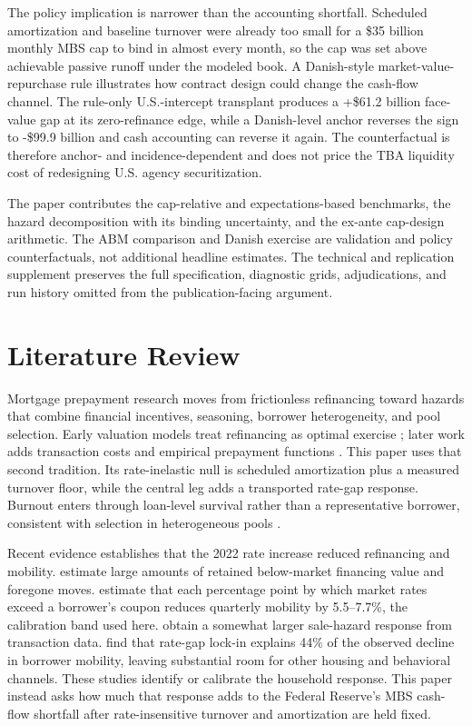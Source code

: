 \documentclass[12pt]{article}
\begin{document}
The policy implication is narrower than the accounting shortfall. Scheduled
amortization and baseline turnover were already too small for a \$35 billion
monthly MBS cap to bind in almost every month, so the cap was set above
achievable passive runoff under the modeled book. A Danish-style
market-value-repurchase rule illustrates how contract design could change the
cash-flow channel. The rule-only U.S.-intercept transplant produces a
+\$61.2 billion face-value gap at its zero-refinance edge, while a
Danish-level anchor reverses the sign to -\$99.9 billion and cash accounting
can reverse it again. The counterfactual is therefore anchor- and
incidence-dependent and does not price the TBA liquidity cost of redesigning
U.S. agency securitization.

The paper contributes the cap-relative and expectations-based benchmarks, the
hazard decomposition with its binding uncertainty, and the ex-ante cap-design
arithmetic. The ABM comparison and Danish exercise are validation and policy
counterfactuals, not additional headline estimates. The technical and
replication supplement preserves the full specification, diagnostic grids,
adjudications, and run history omitted from the publication-facing argument.

\section{Literature Review}\label{sec:lit}

Mortgage prepayment research moves from frictionless refinancing toward hazards
that combine financial incentives, seasoning, borrower heterogeneity, and pool
selection. Early valuation models treat refinancing as optimal exercise
\citep{dunn1981}; later work adds transaction costs and empirical prepayment
functions \citep{schwartz1989,richard1989,stanton1995,agarwal2013}. This paper
uses that second tradition. Its rate-inelastic null is scheduled amortization
plus a measured turnover floor, while the central leg adds a transported
rate-gap response. Burnout enters through loan-level survival rather than a
representative borrower, consistent with selection in heterogeneous pools
\citep{chernov2018,lesniewski2026}.

Recent evidence establishes that the 2022 rate increase reduced refinancing and
mobility. \citet{batzer2024} estimate large amounts of retained below-market
financing value and foregone moves. \citet{liebersohn2024} estimate that each
percentage point by which market rates exceed a borrower's coupon reduces
quarterly mobility by 5.5--7.7\%, the calibration band used here.
\citet{graybill2026} obtain a somewhat larger sale-hazard response from
transaction data. \citet{aladangady2024} find that rate-gap lock-in explains
44\% of the observed decline in borrower mobility, leaving substantial room
for other housing and behavioral channels. These studies identify or calibrate
the household response. This paper instead asks how much that response adds to
the Federal Reserve's MBS cash-flow shortfall after rate-insensitive turnover
and amortization are held fixed.
\end{document}
